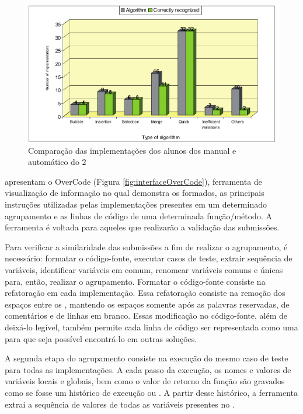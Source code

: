 	    \begin{figure}[ht]
	        \centering
	        \includegraphics[scale=0.33]{imagem/clusterAutomatico.png}
	        \captionsetup{justification=centering}
	        \caption{Comparação das implementações dos alunos dos 
	        	manual e automático do  2}
	        \label{fig:clusterAutomatico}
	    \end{figure}
	    
	     apresentam o OverCode (Figura \ref{fig:interfaceOverCode}),
	    ferramenta de visualização de informação no qual demonstra os  formados,
	    as principais instruções utilizadas pelas implementações presentes em um
	    determinado agrupamento e as linhas de código de uma determinada função/método.
	    A ferramenta é voltada para aqueles que realizarão a validação das submissões.
	    
	    Para verificar a similaridade das submissões a fim de realizar o agrupamento,
	    é necessário: formatar o código-fonte, executar casos de teste, extrair sequência
	    de variáveis, identificar variáveis em comum, renomear variáveis comuns e únicas
	    para, então, realizar o agrupamento. Formatar o código-fonte consiste na refatoração
	    em cada implementação. Essa refatoração consiste na remoção dos espaços entre os
	    , mantendo os espaços somente após as palavras reservadas, de
	    comentários e de linhas em branco. Essas modificação no código-fonte, além de
	    deixá-lo legível, também permite cada linha de código ser representada como
	    uma  para que seja possível encontrá-lo em outras soluções.
	    
	    A segunda etapa do agrupamento consiste na execução do mesmo caso de teste
	    para todas as implementações. A cada passo da execução, os nomes e valores de
	    variáveis locais e globais, bem como o valor de retorno da função são gravados
	    como se fosse um histórico de execução ou . A partir desse
	    histórico, a ferramenta extrai a sequência de valores de todas as variáveis
	    presentes no .
	    
